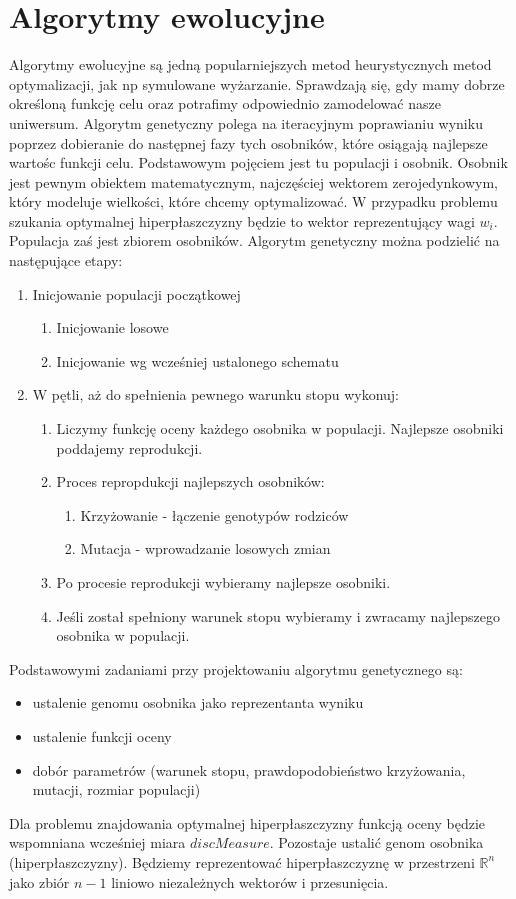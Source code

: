 \documentclass[magisterska]{pracamgr}
\theoremstyle{plain}
\theoremstyle{definition}
\theoremstyle{remark}
\begin{document}
\section{Algorytmy ewolucyjne}
Algorytmy ewolucyjne są jedną popularniejszych metod heurystycznych metod optymalizacji, jak np symulowane wyżarzanie. Sprawdzają się,
gdy mamy dobrze określoną funkcję celu oraz potrafimy odpowiednio zamodelować nasze uniwersum. Algorytm genetyczny polega na iteracyjnym 
poprawianiu wyniku poprzez dobieranie do następnej fazy tych osobników, które osiągają najlepsze wartośc funkcji celu. Podstawowym
pojęciem jest tu populacji i osobnik. Osobnik jest pewnym obiektem matematycznym, najczęściej wektorem zerojedynkowym, który modeluje
wielkości, które chcemy optymalizować. W przypadku problemu szukania optymalnej hiperpłaszczyzny będzie to wektor reprezentujący wagi $w_i$.
Populacja zaś jest zbiorem osobników. Algorytm genetyczny można podzielić na następujące etapy:
\begin{enumerate}
 \item Inicjowanie populacji początkowej
 \begin{enumerate}
  \item Inicjowanie losowe
  \item Inicjowanie wg wcześniej ustalonego schematu
 \end{enumerate}
 \item W pętli, aż do spełnienia pewnego warunku stopu wykonuj:
 \begin{enumerate}
  \item Liczymy funkcję oceny każdego osobnika w populacji. Najlepsze osobniki poddajemy reprodukcji.
  \item Proces repropdukcji najlepszych osobników:
  \begin{enumerate}
   \item Krzyżowanie - łączenie genotypów rodziców
   \item Mutacja - wprowadzanie losowych zmian
  \end{enumerate}
  \item Po procesie reprodukcji wybieramy najlepsze osobniki.
  \item Jeśli został spełniony warunek stopu wybieramy i zwracamy najlepszego osobnika w populacji.
 \end{enumerate}
\end{enumerate}
Podstawowymi zadaniami przy projektowaniu algorytmu genetycznego są:
\begin{itemize}
 \item ustalenie genomu osobnika jako reprezentanta wyniku
 \item ustalenie funkcji oceny
 \item dobór parametrów (warunek stopu, prawdopodobieństwo krzyżowania, mutacji, rozmiar populacji)
\end{itemize}
Dla problemu znajdowania optymalnej hiperpłaszczyzny funkcją oceny będzie wspomniana wcześniej miara $discMeasure$.
Pozostaje ustalić genom osobnika (hiperpłaszczyzny). Będziemy reprezentować hiperpłaszczyznę w przestrzeni $\mathbb{R}^n$
jako zbiór $n-1$ liniowo niezależnych wektorów i przesunięcia. 
\end{document}
